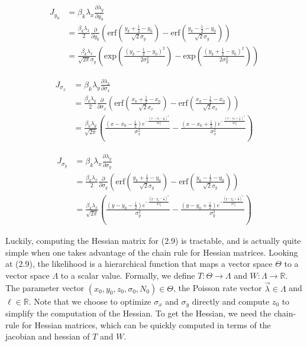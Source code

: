 \begin{align*}
J_{y_{0}} &= \beta_{k}\lambda_{x}\frac{\partial \lambda_{y}}{\partial y_{0}} \\
&= \frac{\beta_{k}\lambda_{x}}{2}\frac{\partial}{\partial y_{0}}\left(\mathrm{erf}\left(\frac{y_{k}+\frac{1}{2}-y_{0}}{\sqrt{2}\sigma_{y}}\right) -\mathrm{erf}\left(\frac{y_{k}-\frac{1}{2}-y_{0}}{\sqrt{2}\sigma_{y}}\right)\right)\\
&= \frac{\beta_{k}\lambda_{x}}{\sqrt{2\pi}\sigma_{y}}\left(\mathrm{exp}\left(\frac{(y_{k}-\frac{1}{2}-y_{0})^{2}}{2\sigma_{y}^{2}}\right) -\mathrm{exp}\left(\frac{(y_{k}+\frac{1}{2}-y_{0})^{2}}{2\sigma_{y}^{2}}\right)\right)
\end{align*}

\begin{align*}
J_{\sigma_{x}} &= \beta_{k}\lambda_{y}\frac{\partial \lambda_{x}}{\partial \sigma_{x}} \\
&= \frac{\beta_{k}\lambda_{y}}{2}\frac{\partial}{\partial \sigma_{x}}\left(\mathrm{erf}\left(\frac{x_{k}+\frac{1}{2}-x_{0}}{\sqrt{2}\sigma_{x}}\right) -\mathrm{erf}\left(\frac{x_{k}-\frac{1}{2}-x_{0}}{\sqrt{2}\sigma_{x}}\right)\right)\\
&= \frac{\beta_{k}\lambda_{y}}{\sqrt{2\pi}}\left(\frac{\left(x-x_{0}-\frac{1}{2}\right) e^{-\frac{\left(x-x_{0}-\frac{1}{2}\right)^2}{2 \sigma_{x} ^2}}}{\sigma_{x} ^2}-\frac{ \left(x-x_{0}+\frac{1}{2}\right) e^{-\frac{\left(x-x_{0}+\frac{1}{2}\right)^2}{2 \sigma_{x} ^2}}}{\sigma_{x} ^2}\right)
\end{align*}

\begin{align*}
J_{\sigma_{y}} &= \beta_{k}\lambda_{x}\frac{\partial \lambda_{y}}{\partial \sigma_{y}} \\
&= \frac{\beta_{k}\lambda_{x}}{2}\frac{\partial}{\partial \sigma_{y}}\left(\mathrm{erf}\left(\frac{y_{k}+\frac{1}{2}-y_{0}}{\sqrt{2}\sigma_{y}}\right) -\mathrm{erf}\left(\frac{y_{k}-\frac{1}{2}-y_{0}}{\sqrt{2}\sigma_{y}}\right)\right)\\
&= \frac{\beta_{k}\lambda_{x}}{\sqrt{2\pi}}\left(\frac{\left(y-y_{0}-\frac{1}{2}\right) e^{-\frac{\left(y-y_{0}-\frac{1}{2}\right)^2}{2 \sigma_{y} ^2}}}{\sigma_{y} ^2}-\frac{ \left(y-y_{0}+\frac{1}{2}\right) e^{-\frac{\left(y-y_{0}+\frac{1}{2}\right)^2}{2 \sigma_{y} ^2}}}{\sigma_{y} ^2}\right)
\end{align*}

Luckily, computing the Hessian matrix for (2.9) is tractable, and is actually quite simple when one takes advantage of the chain rule for Hessian matrices. Looking at (2.9), the likelihood is a hierarchical function that maps a vector space $\Theta$ to a vector space $\Lambda$ to a scalar value. Formally, we define $T: \Theta \rightarrow \Lambda$ and $W: \Lambda \rightarrow \mathbb{R}$. The parameter vector $(x_{0},y_{0},z_{0}, \sigma_{0}, N_{0})\in \Theta$, the Poisson rate vector $\vec{\lambda} \in \Lambda$ and $\ell \in \mathbb{R}$. Note that we choose to optimize $\sigma_{x}$ and $\sigma_{y}$ directly and compute $z_{0}$ to simplify the computation of the Hessian. To get the Hessian, we need the chain-rule for Hessian matrices, which can be quickly computed in terms of the jacobian and hessian of $T$ and $W$.


